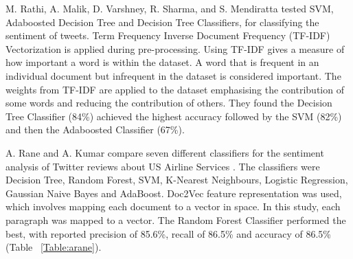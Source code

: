 M. Rathi, A. Malik, D. Varshney, R. Sharma, and S. Mendiratta \cite{Raithi2018} tested SVM, Adaboosted Decision Tree and Decision Tree Classifiers, for classifying the sentiment of tweets. Term Frequency Inverse Document Frequency (TF-IDF) Vectorization is applied during pre-processing. Using TF-IDF gives a measure of how important a word is within the dataset. A word that is frequent in an individual document but infrequent in the dataset is considered important. The weights from TF-IDF are applied to the dataset emphasising the contribution of some words and reducing the contribution of others. They found the Decision Tree Classifier (84\%) achieved the highest accuracy followed by the SVM (82\%) and then the Adaboosted Classifier (67\%).

\begin{table}[h!]
\centering
\caption{Precision, Accuracy and Recall of the classifiers from the study by A. Rane and A. Kumar \cite{Rane2018}.}
\label{Table:arane}
\setlength\extrarowheight{5pt}
\end{table}

A. Rane and A. Kumar compare seven different classifiers for the sentiment analysis of Twitter reviews about US Airline Services \cite{Rane2018}. The classifiers were Decision Tree, Random Forest, SVM, K-Nearest Neighbours, Logistic Regression, Gaussian Naive Bayes and AdaBoost. Doc2Vec feature representation was used, which involves mapping each document to a vector in space. In this study, each paragraph was mapped to a vector. The Random Forest Classifier performed the best, with reported precision of 85.6\%, recall of 86.5\% and accuracy of 86.5\% (Table ~\ref{Table:arane}). 

